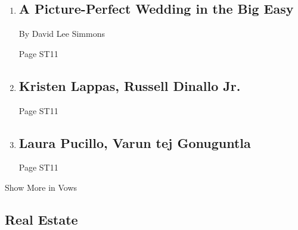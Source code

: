 \begin{enumerate}
\def\labelenumi{\arabic{enumi}.}
\item
  \href{/2018/04/27/fashion/weddings/a-picture-perfect-wedding-in-the-big-easy.html}{}

  \hypertarget{a-picture-perfect-wedding-in-the-big-easy}{%
  \subsection{A Picture-Perfect Wedding in the Big
  Easy}\label{a-picture-perfect-wedding-in-the-big-easy}}

  By David Lee Simmons

  Page ST11
\item
  \href{/2018/04/29/fashion/weddings/kristen-lappas-russell-dinallo-jr.html}{}

  \hypertarget{kristen-lappas-russell-dinallo-jr}{%
  \subsection{Kristen Lappas, Russell Dinallo
  Jr.}\label{kristen-lappas-russell-dinallo-jr}}

  Page ST11
\item
  \href{/2018/04/29/fashion/weddings/laura-pucillo-varun-tej-gonuguntla.html}{}

  \hypertarget{laura-pucillo-varun-tej-gonuguntla}{%
  \subsection{Laura Pucillo, Varun tej
  Gonuguntla}\label{laura-pucillo-varun-tej-gonuguntla}}

  Page ST11
\end{enumerate}

Show More in Vows

\hypertarget{real-estate}{%
\subsection{Real Estate}\label{real-estate}}

